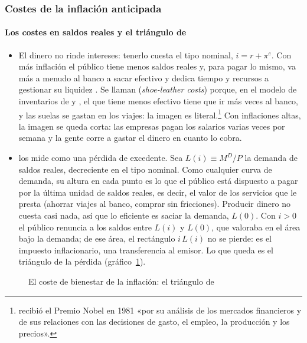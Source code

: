 \documentclass[11pt]{article}
\begin{document}
\subsubsection{Costes de la inflación anticipada}\label{sec:anticipada}

\paragraph{Los costes en saldos reales y el triángulo de }

\begin{itemize}
\item El dinero no rinde intereses: tenerlo cuesta el tipo nominal, $i=r+\pi^e$. Con más inflación el público tiene menos saldos reales y, para pagar lo mismo, va más a menudo al banco a sacar efectivo y dedica tiempo y recursos a gestionar su liquidez . Se llaman  (\emph{shoe-leather costs}) porque, en el modelo de inventarios de  y , el que tiene menos efectivo tiene que ir más veces al banco, y las suelas se gastan en los viajes: la imagen es literal.\footnote{ recibió el Premio Nobel en 1981 «por su análisis de los mercados financieros y de sus relaciones con las decisiones de gasto, el empleo, la producción y los precios»\nocite{Nobel1981Tobin}.} Con inflaciones altas, la imagen se queda corta: las empresas pagan los salarios varias veces por semana y la gente corre a gastar el dinero en cuanto lo cobra.
\item \textcite{Bailey1956Welfare} los mide como una pérdida de excedente. Sea $L(i)\equiv M^D/P$ la demanda de saldos reales, decreciente en el tipo nominal. Como cualquier curva de demanda, su altura en cada punto es lo que el público está dispuesto a pagar por la última unidad de saldos reales, es decir, el valor de los servicios que le presta (ahorrar viajes al banco, comprar sin fricciones). Producir dinero no cuesta casi nada, así que lo eficiente es saciar la demanda, $L(0)$. Con $i>0$ el público renuncia a los saldos entre $L(i)$ y $L(0)$, que valoraba en el área bajo la demanda; de ese área, el rectángulo $i\,L(i)$ no se pierde: es el impuesto inflacionario, una transferencia al emisor. Lo que queda es el triángulo de la pérdida (gráfico~\ref{fig:bailey}).
\end{itemize}

\begin{figure}[H]
\centering
\caption{El coste de bienestar de la inflación: el triángulo de }\label{fig:bailey}
\end{figure}
\end{document}
